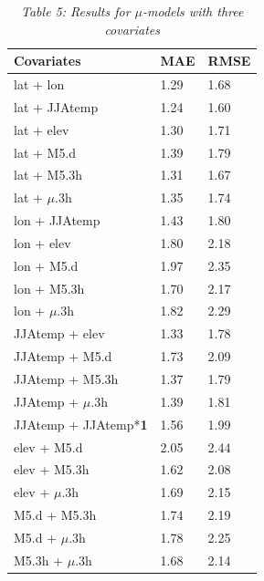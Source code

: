\documentclass[12pt,a4paper,english]{article}
\begin{document}
\begin{singlespace}
\begin{table}
\begin{minipage}[b]{0.34\linewidth}
\vspace{15mm}
\caption*{\sl Table 4: Results for $\mu$-models with two covariates}
\centering
  \begin{tabular}{|l|l|l|}
    \hline
    \hline
    \textbf{Covariates}& \textbf{MAE} & \textbf{RMSE} \\
	\hline
	\hline
	\rowcolor{Gray}
	lat + lon & 1.29 & 1.68 \\
	\hline
	\rowcolor{Gray}
	lat + JJAtemp & 1.24 & 1.60 \\
	\hline
	\rowcolor{Gray}
	lat + elev & 1.30 & 1.71 \\
	\hline
	\rowcolor{Gray}	
	lat + M5.d & 1.39 & 1.79 \\
	\hline
	\rowcolor{Gray}
	lat + M5.3h & 1.31 & 1.67 \\
	\hline
	\rowcolor{Gray}
	lat + $\mu$.3h & 1.35 & 1.74 \\
	\hline
	lon + JJAtemp & 1.43 & 1.80 \\
	\hline
	lon + elev & 1.80 & 2.18 \\
	\hline
	lon + M5.d & 1.97 & 2.35 \\
	\hline
	lon + M5.3h & 1.70 & 2.17 \\
	\hline
	lon + $\mu$.3h & 1.82 & 2.29 \\
	\hline
	\rowcolor{Gray}
	JJAtemp + elev & 1.33 & 1.78 \\
	\hline
	JJAtemp + M5.d & 1.73 & 2.09 \\
	\hline
	\rowcolor{Gray}
	JJAtemp + M5.3h & 1.37 & 1.79 \\
	\hline	
	\rowcolor{Gray}
	JJAtemp + $\mu$.3h & 1.39 & 1.81 \\
	\hline
	JJAtemp + JJAtemp*\textbf{1} & 1.56 & 1.99 \\
	\hline
	elev + M5.d & 2.05 & 2.44 \\
	\hline
	elev + M5.3h & 1.62 & 2.08 \\
	\hline
	elev + $\mu$.3h & 1.69 & 2.15 \\
	\hline
	M5.d + M5.3h & 1.74 & 2.19 \\
	\hline
	M5.d + $\mu$.3h & 1.78 & 2.25 \\
	\hline
	M5.3h + $\mu$.3h & 1.68 & 2.14 \\
   \hline
   \hline
\end{tabular}
\vspace{20mm}
\end{minipage}
%
\hspace{32mm}
\begin{minipage}[b]{0.33\linewidth}
\caption*{\sl Table 5: Results for $\mu$-models with three covariates}

\end{minipage}
\end{table}
\end{singlespace}
\end{document}
